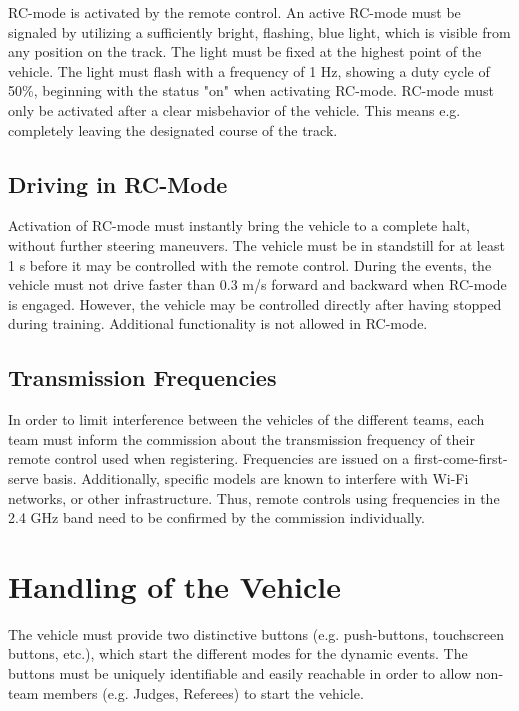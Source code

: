 RC-mode is activated by the remote control. An active RC-mode must be signaled
by utilizing a sufficiently bright, flashing, blue light, which is visible from
any position on the track. The light must be fixed at the highest point of the
vehicle. The light must flash with a frequency of 1 Hz, showing a duty cycle of
50\%, beginning with the status "on" when activating RC-mode. RC-mode must only
be activated after a clear misbehavior of the vehicle. This means e.g.
completely leaving the designated course of the track.

\subsection{Driving in RC-Mode}

Activation of RC-mode must instantly bring the vehicle to a complete halt,
without further steering maneuvers. The vehicle must be in standstill for at
least 1 s before it may be controlled with the remote control. During the
events, the vehicle must not drive faster than 0.3 m/s forward and backward
when RC-mode is engaged. However, the vehicle may be controlled directly after
having stopped during training. Additional functionality is not allowed in
RC-mode.

\subsection{Transmission Frequencies}

In order to limit interference between the vehicles of the different teams,
each team must inform the commission about the transmission frequency of their
remote control used when registering. Frequencies are issued on a
first-come-first-serve basis. Additionally, specific models are known to
interfere with Wi-Fi networks, or other infrastructure. Thus, remote controls
using frequencies in the 2.4 GHz band need to be confirmed by the commission
individually.

\section{Handling of the Vehicle}

The vehicle must provide two distinctive buttons (e.g. push-buttons,
touchscreen buttons, etc.), which start the different modes for the dynamic
events. The buttons must be  uniquely 
identifiable and easily reachable in order to allow non-team members 
(e.g. Judges, Referees) to start the vehicle.

